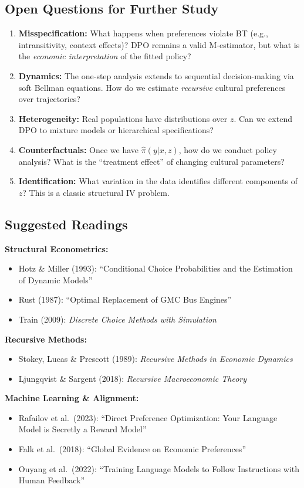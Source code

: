 \documentclass[11pt]{article}
\newcommand{\1}{\mathbf{1}}
\theoremstyle{plain}
\theoremstyle{definition}
\theoremstyle{remark}
\begin{document}
\subsection{Open Questions for Further Study}

\begin{enumerate}
\item \textbf{Misspecification:} What happens when preferences violate BT (e.g., intransitivity, context effects)? DPO remains a valid M-estimator, but what is the \emph{economic interpretation} of the fitted policy?

\item \textbf{Dynamics:} The one-step analysis extends to sequential decision-making via soft Bellman equations. How do we estimate \emph{recursive} cultural preferences over trajectories?

\item \textbf{Heterogeneity:} Real populations have distributions over $z$. Can we extend DPO to mixture models or hierarchical specifications?

\item \textbf{Counterfactuals:} Once we have $\hat{\pi}(y|x,z)$, how do we conduct policy analysis? What is the ``treatment effect'' of changing cultural parameters?

\item \textbf{Identification:} What variation in the data identifies different components of $z$? This is a classic structural IV problem.
\end{enumerate}
\subsection{Suggested Readings}

\textbf{Structural Econometrics:}
\begin{itemize}
\item Hotz \& Miller (1993): ``Conditional Choice Probabilities and the Estimation of Dynamic Models''
\item Rust (1987): ``Optimal Replacement of GMC Bus Engines''
\item Train (2009): \emph{Discrete Choice Methods with Simulation}
\end{itemize}

\noindent \textbf{Recursive Methods:}
\begin{itemize}
\item Stokey, Lucas \& Prescott (1989): \emph{Recursive Methods in Economic Dynamics}
\item Ljungqvist \& Sargent (2018): \emph{Recursive Macroeconomic Theory}
\end{itemize}

\noindent \textbf{Machine Learning \& Alignment:}
\begin{itemize}
\item Rafailov et al.\ (2023): ``Direct Preference Optimization: Your Language Model is Secretly a Reward Model''
\item Falk et al.\ (2018): ``Global Evidence on Economic Preferences''
\item Ouyang et al.\ (2022): ``Training Language Models to Follow Instructions with Human Feedback''
\end{itemize}

\vfill
\end{document}
